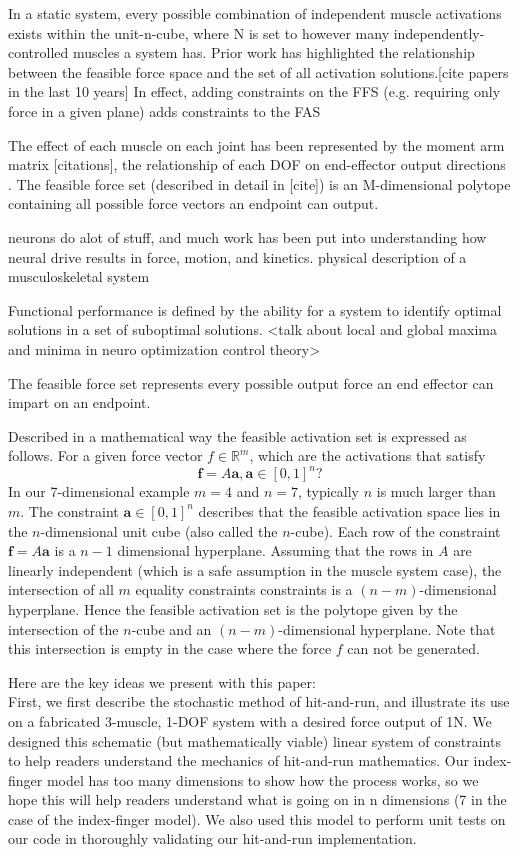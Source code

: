 In a static system, every possible combination of independent muscle activations exists within the unit-n-cube, where N is set to however many independently-controlled muscles a system has.
Prior work has highlighted the relationship between the feasible force space and the set of all activation solutions.[cite papers in the last 10 years]
In effect, adding constraints on the FFS (e.g. requiring only force in a given plane) adds constraints to the FAS

The effect of each muscle on each joint has been represented by the moment arm matrix [citations], the relationship of each DOF on end-effector output directions .
The feasible force set (described in detail in [cite]) is an M-dimensional polytope containing all possible force vectors an endpoint can output.

neurons do alot of stuff, and much work has been put into understanding how neural drive results in force, motion, and kinetics. 
physical description of a musculoskeletal system


Functional performance is defined by the ability for a system to identify optimal solutions in a set of suboptimal solutions. 
<talk about local and global maxima and minima in neuro optimization control theory>

The feasible force set represents every possible output force an end effector can impart on an endpoint.


Described in a mathematical way the feasible activation set is expressed as follows. For a given force vector $f \in \mathbb{R}^m$, which are the activations that satisfy
\[\textbf{f} = A\textbf{a}, \textbf{a} \in [0,1]^n?\]
In our 7-dimensional example $m =4$ and $n =7$, typically $n$ is much larger than $m$.
The constraint $\textbf{a} \in [0,1]^n$ describes that the feasible activation space lies in the $n$-dimensional unit cube (also called the $n$-cube). Each row of the constraint $\textbf{f} = A\textbf{a}$ is a $n-1$ dimensional hyperplane. Assuming that the rows in $A$ are linearly independent (which is a safe assumption in the muscle system case), the intersection of all $m$ equality constraints constraints is a $(n-m)$-dimensional hyperplane. Hence the feasible activation set is the polytope given by the intersection of the $n$-cube and an $(n-m)$-dimensional hyperplane. Note that this intersection is empty in the case where the force $f$ can not be generated.


Here are the key ideas we present with this paper:\\
First, we first describe the stochastic method of hit-and-run, and illustrate its use on a fabricated 3-muscle, 1-DOF system with a desired force output of 1N. We designed this schematic (but mathematically viable) linear system of constraints to help readers understand the mechanics of hit-and-run mathematics. Our index-finger model has too many dimensions to show how the process works, so we hope this will help readers understand what is going on in n dimensions (7 in the case of the index-finger model). We also used this model to perform unit tests on our code in thoroughly validating our hit-and-run implementation.

